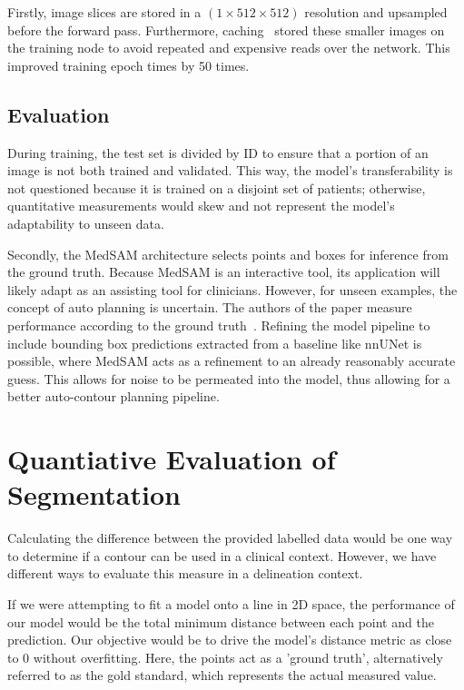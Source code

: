 \documentclass[12pt,twoside]{report}
\begin{document}
Firstly, image slices are stored in a $(1 \times 512 \times 512)$ resolution and upsampled before the forward pass. Furthermore, caching~\cite{charlie-caching} stored these smaller images on the training node to avoid repeated and expensive reads over the network. This improved training epoch times by 50 times.

\subsection{Evaluation}

During training, the test set is divided by ID to ensure that a portion of an image is not both trained and validated. This way, the model's transferability is not questioned because it is trained on a disjoint set of patients; otherwise, quantitative measurements would skew and not represent the model's adaptability to unseen data.

Secondly, the MedSAM architecture selects points and boxes for inference from the ground truth. Because MedSAM is an interactive tool, its application will likely adapt as an assisting tool for clinicians. However, for unseen examples, the concept of auto planning is uncertain. The authors of the paper measure performance according to the ground truth~\cite{SAM, Ma2024}. Refining the model pipeline to include bounding box predictions extracted from a baseline like nnUNet is possible, where MedSAM acts as a refinement to an already reasonably accurate guess. This allows for noise to be permeated into the model, thus allowing for a better auto-contour planning pipeline.

\section{Quantiative Evaluation of Segmentation}\label{sect:performance-evaluation}

Calculating the difference between the provided labelled data would be one way to determine if a contour can be used in a clinical context. However, we have different ways to evaluate this measure in a delineation context.

If we were attempting to fit a model onto a line in 2D space, the performance of our model would be the total minimum distance between each point and the prediction. Our objective would be to drive the model's distance metric as close to 0 without overfitting. Here, the points act as a 'ground truth', alternatively referred to as the gold standard, which represents the actual measured value.
\end{document}
